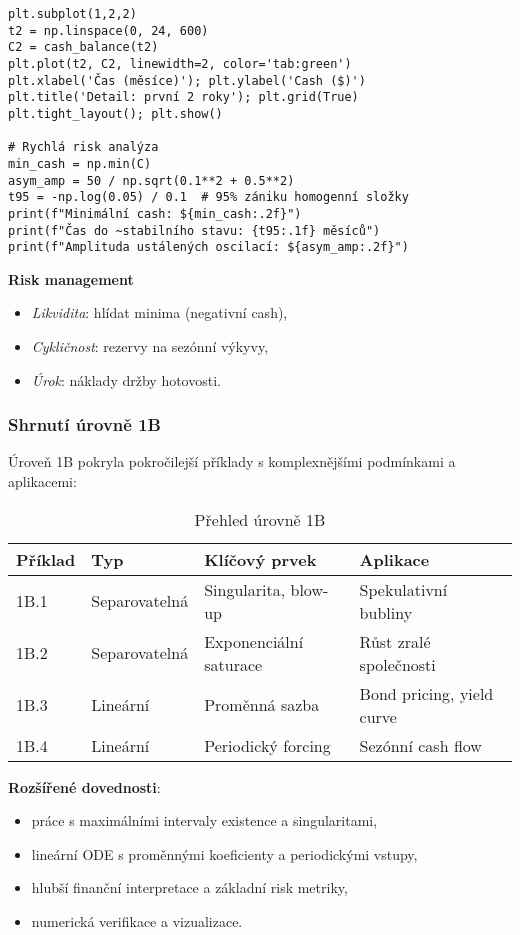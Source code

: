 \begin{example}
\begin{verbatim}
plt.subplot(1,2,2)
t2 = np.linspace(0, 24, 600)
C2 = cash_balance(t2)
plt.plot(t2, C2, linewidth=2, color='tab:green')
plt.xlabel('Čas (měsíce)'); plt.ylabel('Cash ($)')
plt.title('Detail: první 2 roky'); plt.grid(True)
plt.tight_layout(); plt.show()

# Rychlá risk analýza
min_cash = np.min(C)
asym_amp = 50 / np.sqrt(0.1**2 + 0.5**2)
t95 = -np.log(0.05) / 0.1  # 95% zániku homogenní složky
print(f"Minimální cash: ${min_cash:.2f}")
print(f"Čas do ~stabilního stavu: {t95:.1f} měsíců")
print(f"Amplituda ustálených oscilací: ${asym_amp:.2f}")
\end{verbatim}

\textbf{Risk management}
\begin{itemize}
\item \textit{Likvidita}: hlídat minima (negativní cash),
\item \textit{Cykličnost}: rezervy na sezónní výkyvy,
\item \textit{Úrok}: náklady držby hotovosti.
\end{itemize}
\end{example}

\subsubsection{Shrnutí úrovně 1B}
\label{sec:shrnuti-1b}

Úroveň 1B pokryla pokročilejší příklady s komplexnějšími podmínkami a aplikacemi:

\begin{table}[h]
\centering
\caption{Přehled úrovně 1B}
\label{tab:prehled-1b}
\begin{tabular}{|l|l|l|l|}
\hline
\textbf{Příklad} & \textbf{Typ} & \textbf{Klíčový prvek} & \textbf{Aplikace} \\
\hline
1B.1 & Separovatelná & Singularita, blow-up & Spekulativní bubliny \\
1B.2 & Separovatelná & Exponenciální saturace & Růst zralé společnosti \\
1B.3 & Lineární      & Proměnná sazba         & Bond pricing, yield curve \\
1B.4 & Lineární      & Periodický forcing      & Sezónní cash flow \\
\hline
\end{tabular}
\end{table}

\textbf{Rozšířené dovednosti}:
\begin{itemize}
\item práce s maximálními intervaly existence a singularitami,
\item lineární ODE s proměnnými koeficienty a periodickými vstupy,
\item hlubší finanční interpretace a základní risk metriky,
\item numerická verifikace a vizualizace.
\end{itemize}

